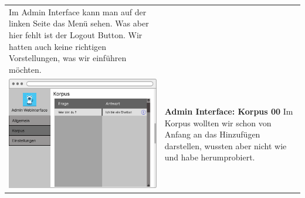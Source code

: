 \begin{tabular}{C{6cm}  L{7cm}}
    Im Admin Interface kann man auf der linken Seite das Menü sehen. Was aber hier fehlt ist der Logout Button.
    Wir hatten auch keine richtigen Vorstellungen, was wir einführen möchten.                                                                   \\
    \includegraphics[width=\linewidth]{bilder/old vers. UI Design/Admin Interface (1).png}       & \textbf{Admin Interface: Korpus 00} \newline
    Im Korpus wollten wir schon von Anfang an das Hinzufügen darstellen, wussten aber nicht
    wie und habe herumprobiert.
\end{tabular}


